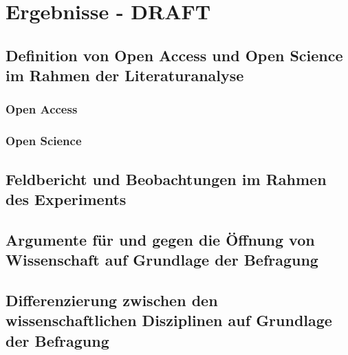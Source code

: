 \chapter{Ergebnisse - DRAFT}

\section{Definition von Open Access und Open Science im Rahmen der Literaturanalyse}
\subsection{Open Access}
\subsection{Open Science}
\section{Feldbericht und Beobachtungen im Rahmen des Experiments}
\section{Argumente für und gegen die Öffnung von Wissenschaft auf Grundlage der Befragung}
\section{Differenzierung zwischen den wissenschaftlichen Disziplinen auf Grundlage der Befragung}